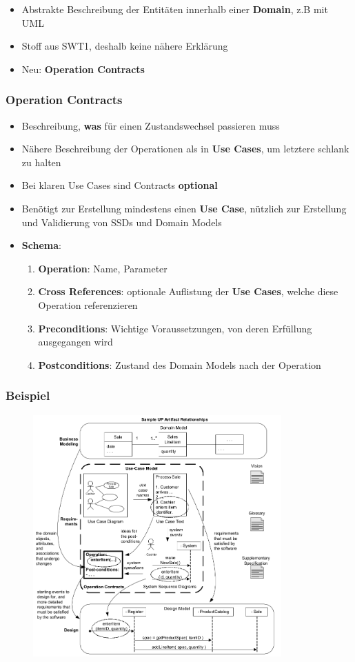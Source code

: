 \begin{itemize}
	\item Abstrakte Beschreibung der Entitäten innerhalb einer \textbf{Domain}, z.B mit UML
	\item Stoff aus SWT1, deshalb keine nähere Erklärung
	\item Neu: \textbf{Operation Contracts}
\end{itemize}

\subsubsection{Operation Contracts}
\label{an:ssub:operation_contracts}

\begin{itemize}
	\item Beschreibung, \textbf{was} für einen Zustandswechsel passieren muss
	\item Nähere Beschreibung der Operationen als in \textbf{Use Cases}, um letztere schlank zu halten
	\item Bei klaren Use Cases sind Contracts \textbf{optional}
	\item Benötigt zur Erstellung mindestens einen \textbf{Use Case}, nützlich zur Erstellung und Validierung von SSDs und Domain Models
	\item \textbf{Schema}:
	\begin{enumerate}
		\item \textbf{Operation}: Name, Parameter
		\item \textbf{Cross References}: optionale Auflistung der \textbf{Use Cases}, welche diese Operation referenzieren
		\item \textbf{Preconditions}: Wichtige Voraussetzungen, von deren Erfüllung ausgegangen wird
		\item \textbf{Postconditions}: Zustand des Domain Models nach der Operation
	\end{enumerate}
\end{itemize}

\subsubsection{Beispiel}
\label{an:ssub:beispiel1}

\begin{figure}[!h]
	\centering
	\includegraphics[width=0.85\textwidth]{images/domain_model.png}
\end{figure}